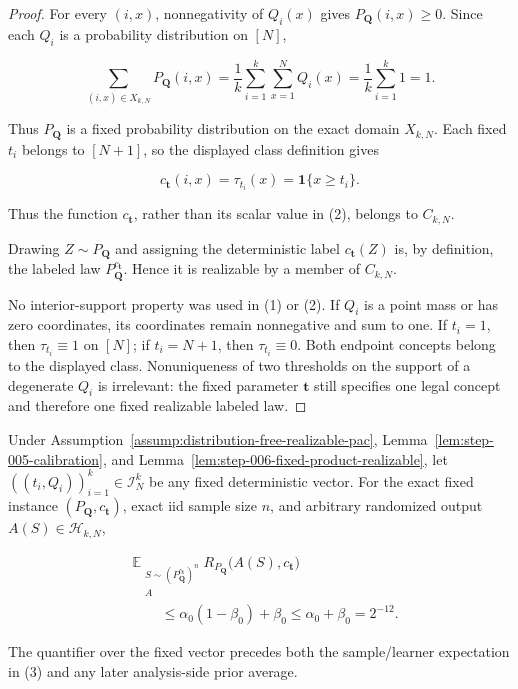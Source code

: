 \begin{proof}
For every \((i,x)\), nonnegativity of \(Q_i(x)\) gives
\(P_{\boldsymbol Q}(i,x)\ge0\). Since each \(Q_i\) is a probability
distribution on \([N]\),

\[
\sum_{(i,x)\in X_{k,N}}P_{\boldsymbol Q}(i,x)
=\frac1k\sum_{i=1}^k\sum_{x=1}^NQ_i(x)
=\frac1k\sum_{i=1}^k1
=1.
\tag{1}
\]

Thus \(P_{\boldsymbol Q}\) is a fixed probability distribution on the
exact domain \(X_{k,N}\). Each fixed \(t_i\) belongs to \([N+1]\), so
the displayed class definition gives

\[
c_{\boldsymbol t}(i,x)=\tau_{t_i}(x)
=\mathbf 1\{x\ge t_i\}.
\tag{2}
\]

Thus the function \(c_{\boldsymbol t}\), rather than its scalar value in
(2), belongs to \(C_{k,N}\).

Drawing \(Z\sim P_{\boldsymbol Q}\) and assigning the deterministic label
\(c_{\boldsymbol t}(Z)\) is, by definition, the labeled law
\(P_{\boldsymbol Q}^{c_{\boldsymbol t}}\). Hence it is realizable by a
member of \(C_{k,N}\).

No interior-support property was used in (1) or (2). If \(Q_i\) is a point
mass or has zero coordinates, its coordinates remain nonnegative and sum to
one. If \(t_i=1\), then \(\tau_{t_i}\equiv1\) on \([N]\); if
\(t_i=N+1\), then \(\tau_{t_i}\equiv0\). Both endpoint concepts belong
to the displayed class. Nonuniqueness of two thresholds on the support of a
degenerate \(Q_i\) is irrelevant: the fixed parameter
\(\boldsymbol t\) still specifies one legal concept and therefore one
fixed realizable labeled law. \end{proof}

\begin{proposition}\label{prop:step-006-pointwise-pac-expectation}
Under Assumption~\ref{assump:distribution-free-realizable-pac}, Lemma~\ref{lem:step-005-calibration}, and
Lemma~\ref{lem:step-006-fixed-product-realizable}, let
\(((t_i,Q_i))_{i=1}^k\in\mathcal I_N^k\) be any fixed deterministic
vector. For the exact fixed instance
\((P_{\boldsymbol Q},c_{\boldsymbol t})\), exact iid sample size \(n\),
and arbitrary randomized output \(A(S)\in\mathcal H_{k,N}\),

\[
\begin{aligned}
&\mathbb E_{\substack{S\sim
  (P_{\boldsymbol Q}^{c_{\boldsymbol t}})^n\\ A}}
  R_{P_{\boldsymbol Q}}\bigl(A(S),c_{\boldsymbol t}\bigr)\\
&\qquad\le
  \alpha_0(1-\beta_0)+\beta_0
  \le\alpha_0+\beta_0
  =2^{-12}.
\end{aligned}
\tag{3}
\]

The quantifier over the fixed vector precedes both the sample/learner
expectation in (3) and any later analysis-side prior average.
\end{proposition}

